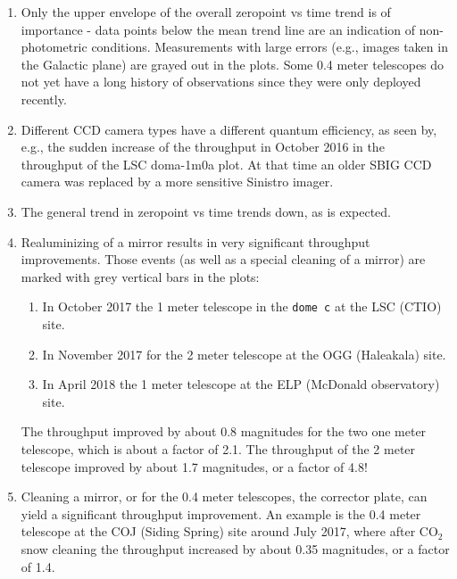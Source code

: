 \documentclass[]{spieman}
\begin{document}
\begin{enumerate}

\item Only the upper envelope of the overall zeropoint vs time trend is of importance - data points
below the mean trend line are an indication of non-photometric conditions. Measurements with large
errors (e.g., images taken in the Galactic plane) are grayed out in the plots. Some 0.4 meter 
telescopes do not yet have a long history of observations since they were only deployed recently.

\item Different CCD camera types have a different quantum efficiency, as seen by, e.g., the sudden
increase of the throughput in October 2016 in the throughput of the LSC doma-1m0a plot. At that time
an older SBIG CCD camera was replaced by a more sensitive Sinistro imager.

\item The general trend in zeropoint vs time trends down, as is expected.

\item Realuminizing of a mirror results in very significant throughput improvements. Those events 
(as well as a special cleaning of a mirror) are marked with grey vertical bars in the plots:
 \begin{enumerate}
 	\item In October 2017 the 1 meter telescope in the {\tt dome c} at the LSC (CTIO) site.
    \item In November 2017 for the 2 meter telescope at the OGG (Haleakala) site. 
    \item In April 2018 the 1 meter telescope at the ELP  (McDonald observatory) site.
\end{enumerate}
 The throughput improved by about 0.8 magnitudes for the two one meter telescope, which is about a 
 factor of 2.1. The throughput of the 2 meter telescope improved by about 1.7 magnitudes, or a 
 factor of 4.8!

\item Cleaning a mirror, or for the 0.4 meter telescopes, the  corrector plate, can yield
a significant throughput improvement. An example is the 0.4 meter telescope at the COJ (Siding 
Spring) site around July 2017, where after CO$_2$ snow cleaning the throughput increased by about 
0.35 magnitudes, or a factor of 1.4. 


\end{enumerate}
\end{document}

